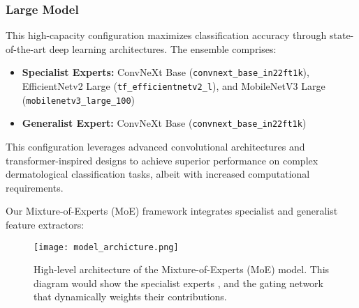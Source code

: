 \subsubsection*{Large  Model}
This high-capacity configuration maximizes classification accuracy through state-of-the-art deep learning architectures. The ensemble comprises:
\begin{itemize}
  \item \textbf{Specialist Experts:} ConvNeXt Base (\texttt{convnext\_base\_in22ft1k}), EfficientNetv2 Large (\texttt{tf\_efficientnetv2\_l}), and MobileNetV3 Large (\texttt{mobilenetv3\_large\_100})
  \item \textbf{Generalist Expert:} ConvNeXt Base (\texttt{convnext\_base\_in22ft1k})
\end{itemize}
This configuration leverages advanced convolutional architectures and transformer-inspired designs to achieve superior performance on complex dermatological classification tasks, albeit with increased computational requirements.

Our Mixture-of-Experts (MoE) framework integrates specialist and generalist feature extractors:

\begin{figure}[H]
  \centering
\texttt{[image: model\_archicture.png]}
  
  \caption{High-level architecture of the Mixture-of-Experts (MoE) model. This diagram would show the specialist experts , and the gating network that dynamically weights their contributions.}
  \label{fig:model-architecture}
\end{figure}



